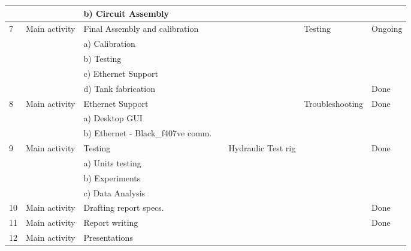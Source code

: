 \begin{landscape}
\begin{table}[]
{\begin{tabular}{|l|l|l|l|l|l|l|}
   &               & b) Circuit Assembly                 &                       &                    &                       &         \\ \hline
7  & Main activity & Final Assembly and calibration      &                       &                    & Testing               & Ongoing \\ \hline
   &               & a) Calibration                      &                       &                    &                       &         \\ \hline
   &               & b) Testing                          &                       &                    &                       &         \\ \hline
   &               & c) Ethernet Support                 &                       &                    &                       &         \\ \hline
   &               & d) Tank fabrication                 &                       &                    &                       & Done    \\ \hline
8  & Main activity & Ethernet Support                    &                       &                    & Troubleshooting       & Done    \\ \hline
   &               & a) Desktop GUI                      &                       &                    &                       &         \\ \hline
   &               & b) Ethernet - Black\_f407ve comm.   &                       &                    &                       &         \\ \hline
9  & Main activity & Testing                             &                       & Hydraulic Test rig &                       & Done    \\ \hline
   &               & a) Units testing                    &                       &                    &                       &         \\ \hline
   &               & b) Experiments                      &                       &                    &                       &         \\ \hline
   &               & c) Data Analysis                    &                       &                    &                       &         \\ \hline
10 & Main activity & Drafting report specs.              &                       &                    &                       & Done    \\ \hline
11 & Main activity & Report writing                      &                       &                    &                       & Done    \\ \hline
12 & Main activity & Presentations                       &                       &                    &                       &         \\ \hline
\end{tabular}%
}
\end{table}
\end{landscape}


